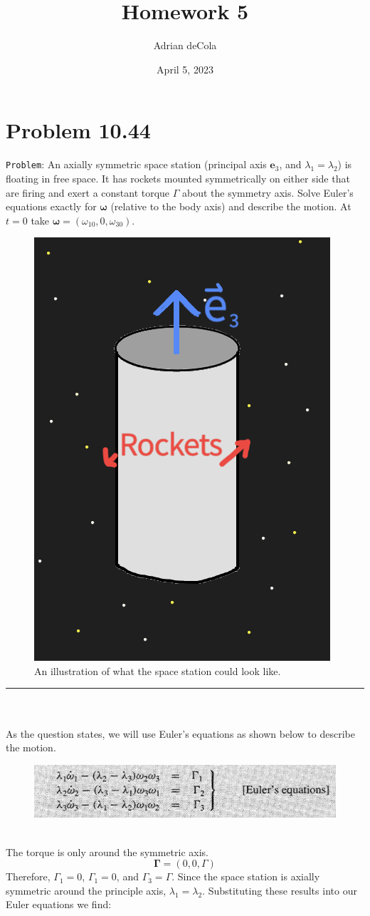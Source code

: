 \documentclass{article}
\title{Homework 5}
\author{Adrian deCola}
\date{April 5, 2023}
\begin{document}
\maketitle


\section*{Problem 10.44}
\verb+Problem+: An axially symmetric space station (principal axis $\boldsymbol{e}_3$, and $\lambda_1 = \lambda_2$) is floating in free space. It has rockets mounted symmetrically on either side that are firing and exert a constant torque $\Gamma$ about the symmetry axis. Solve Euler's equations exactly for $\boldsymbol{\omega}$ (relative to the body axis) and describe the motion. At $t = 0$ take $\boldsymbol{\omega} = (\omega_{10} , 0, \omega_{30})$.


\begin{figure}[!h]
    \centering
    \includegraphics[width=.45\textwidth]{hw5_fig1.png}
    \caption{An illustration of what the space station could look like.}
\end{figure}


\hrule
         \ \ \ 
\\
\\
As the question states, we will use Euler's equations as shown below to describe the motion. 
\begin{figure}[!h]
    \centering
    \includegraphics[width=.8\textwidth]{hw5_fig2.png}
\end{figure}
\\
The torque is only around the symmetric axis. 
$$\boldsymbol{\Gamma}=(0, 0, \Gamma )$$
Therefore, $\Gamma_1=0$, $\Gamma_1=0$, and $\Gamma_3=\Gamma$. Since the space station is axially symmetric around the principle axis, $\lambda_1 = \lambda_2$. Substituting these results into our Euler equations we find: 
\end{document}
